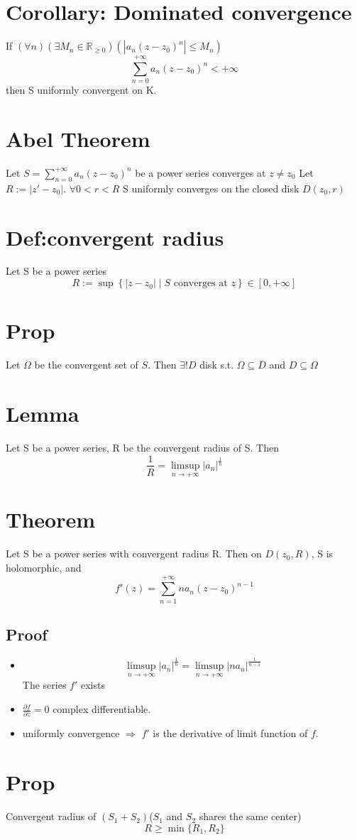 \documentclass{book}
\newcommand{\abs}[1]{\left\lvert #1 \right\rvert}
\begin{document}
\section{Corollary: Dominated convergence}
If $(\forall n)(\exists M_n\in \mathbb R_{\geq 0})(\abs{a_n(z-z_0)^n}\leq M_n)$
$$\sum\limits_{n=0}^{+\infty}a_n(z-z_0)^n<+\infty$$
then S uniformly convergent on K.
\section{Abel Theorem}
Let $S=\sum\limits_{n=0}^{+\infty}a_n(z-z_0)^n$ be a power series converges at $z\neq z_0$ Let $R:=\abs{z'-z_0}$. $\forall 0<r<R$ S uniformly converges on the closed disk $\overline D(z_0,r)$
\section{Def:convergent radius}
Let S be a power series
$$R:=\sup\left\{\abs{z-z_0}\mid S \text{ converges at }z\right\}\in [0,+\infty]$$
\section{Prop}
Let $\Omega$ be the convergent set of $S$. Then $\exists! D$ disk s.t. $\Omega\subseteq\overline D$ and $D\subseteq \Omega$
\section{Lemma}
Let S be a power series, R be the convergent radius of S. Then 
$$\frac{1}R=\limsup\limits_{n\to +\infty}\abs{a_n}^{\frac{1}n}$$
\section{Theorem}
Let S be a power series with convergent radius R. Then on $D(z_0,R)$, S is holomorphic, and $$f'(z)=\sum\limits_{n=1}^{+\infty}na_n(z-z_0)^{n-1}$$
\subsection*{Proof}
\begin{itemize}
    \item $$\limsup\limits_{n\to +\infty}\abs{a_n}^{\frac{1}n}=\limsup\limits_{n\to +\infty}\abs{na_n}^{\frac{1}{n-1}}$$The series $f'$ exists
    \item $\frac{\partial f}{\partial \overline z}=0$ complex differentiable.
    \item uniformly convergence $\Rightarrow$ $f'$ is the derivative of limit function of $f$.
\end{itemize}
\section{Prop}
Convergent radius of $(S_1+S_2)$($S_1$ and $S_2$ shares the same center)
$$R\geq\min\{R_1,R_2\}$$
\end{document}

